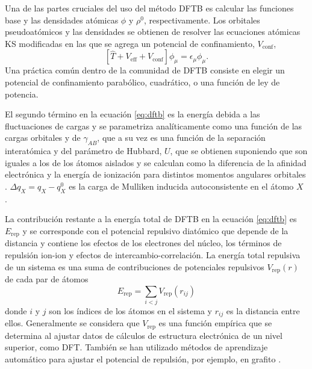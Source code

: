 Una de las partes cruciales del uso del método DFTB es calcular las funciones 
base y las densidades atómicas $\phi$ y $\rho^0$, respectivamente. Los orbitales
pseudoatómicos y las densidades se obtienen de resolver las ecuaciones atómicas KS 
modificadas en las que se agrega un potencial de confinamiento, $V_{\text{conf}}$,
\begin{equation}\label{eq:dft}
    \left[\hat{T}+V_{\text{eff}}+V_{\text{conf}}\right]\phi_\mu=\epsilon_\mu\phi_\mu.
\end{equation}
Una práctica común dentro de la comunidad de DFTB consiste en elegir un potencial
de confinamiento parabólico, cuadrático, o una función de ley de potencia.

El segundo término en la ecuación \ref{eq:dftb} es la energía debida a las 
fluctuaciones de cargas y se parametriza analíticamente como una función de las
cargas orbitales y de $\gamma_{AB}$, que a su vez es una función de la separación 
interatómica y del parámetro de Hubbard, $U$, que se obtienen suponiendo que son 
iguales a los de los átomos aislados y se calculan como la diferencia de la 
afinidad electrónica y la energía de ionización para distintos momentos angulares 
orbitales \cite{elstner1998b}. $\Delta q_X = q_X - q_X^0$ es la carga de Mulliken 
inducida autoconsistente en el átomo $X$ \cite{elstner1998}.

La contribución restante a la energía total de DFTB en la ecuación \ref{eq:dftb}
es $E_{\text{rep}}$ y se corresponde con el potencial repulsivo diatómico que 
depende de la distancia y contiene los efectos de los electrones del núcleo, los 
términos de repulsión ion-ion y efectos de intercambio-correlación. 
La energía total repulsiva de un sistema es una suma de contribuciones de 
potenciales repulsivos $V_{\text{rep}}(r)$ de cada par de átomos
\begin{equation}\label{eq:rep}
    E_{\text{rep}}=\sum_{i<j} V_{\text{rep}}(r_{ij})
\end{equation}
donde $i$ y $j$ son los índices de los átomos en el sistema y $r_{ij}$ es la 
distancia entre ellos. Generalmente se considera que $V_{\text{rep}}$ es una
función empírica que se determina al ajustar datos de cálculos de estructura 
electrónica de un nivel superior, como DFT. También se han utilizado métodos de 
aprendizaje automático para ajustar el potencial de repulsión, por ejemplo, en 
grafito \cite{panosetti2021, annies2021}.
